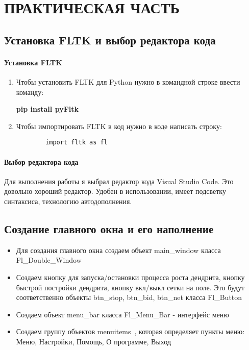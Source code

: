 \chapter{\label{ch:ch02}ПРАКТИЧЕСКАЯ ЧАСТЬ}

\section{Установка FLTK и выбор редактора кода}
\subsubsection{Установка FLTK}
\begin{enumerate}
    \item Чтобы установить FLTK для Python нужно в командной строке ввести команду:
    
    \textbf{pip install pyFltk}
   
    \item Чтобы импортировать FLTK в код нужно в коде написать строку:
    \begin{verbatim}
        import fltk as fl
    \end{verbatim}
    
\end{enumerate}
\subsubsection{Выбор редактора кода}
Для выполнения работы я выбрал редактор кода Visual Studio Code. Это довольно хороший редактор. Удобен в использовании, 
имеет подсветку синтаксиса, технологию автодополнения.

\section{Создание главного окна и его наполнение}
\begin{itemize}
    \item Для создания главного окна создаем объект main\_window класса Fl\_Double\_Window
    \item Создаем кнопку для запуска/остановки процесса роста дендрита, кнопку быстрой постройки дендрита, кнопку вкл/выкл сетки на поле. Это будут соответственно объекты btn\_stop, btn\_bid, btn\_net класса Fl\_Button
    \item Создаем объект menu\_bar класса Fl\_Menu\_Bar - интерфейс меню
    \item Создаем группу объектов menuitems~\cite{docPyFl}, которая определяет пункты меню: Меню, Настройки, Помощь, О программе, Выход
\end{itemize}

